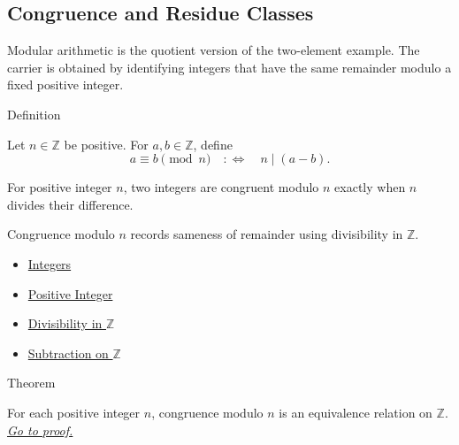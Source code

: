 \subsection*{Congruence and Residue Classes}

\begin{remark*}[Exposition]
Modular arithmetic is the quotient version of the two-element example. The
carrier is obtained by identifying integers that have the same remainder
modulo a fixed positive integer.
\end{remark*}

\begin{definitionbox}{Definition}
\begin{definition}
\label{def:congruence-modulo-integer}
Let \(n\in\mathbb{Z}\) be positive. For \(a,b\in\mathbb{Z}\), define
\[
a\equiv b \pmod n
\quad:\Longleftrightarrow\quad
n\mid (a-b).
\]
\end{definition}
\end{definitionbox}

\begin{remark*}
For positive integer \(n\), two integers are congruent modulo \(n\) exactly
when \(n\) divides their difference.
\end{remark*}

\begin{remark*}[Interpretation]
Congruence modulo \(n\) records sameness of remainder using divisibility in
\(\mathbb{Z}\).
\end{remark*}

\begin{dependencies}
\begin{itemize}
  \item \hyperref[def:integers]{Integers}
  \item \hyperref[def:positive-integer]{Positive Integer}
  \item \hyperref[def:divisibility-in-z]{Divisibility in \(\mathbb{Z}\)}
  \item \hyperref[def:subtraction-on-z]{Subtraction on \(\mathbb{Z}\)}
\end{itemize}
\end{dependencies}

\begin{theorembox}{Theorem}
\begin{theorem}
\label{thm:congruence-modulo-integer-equivalence}
For each positive integer \(n\), congruence modulo \(n\) is an equivalence
relation on \(\mathbb{Z}\).
\hyperref[prf:congruence-modulo-integer-equivalence]{\textit{Go to proof.}}
\end{theorem}
\end{theorembox}

